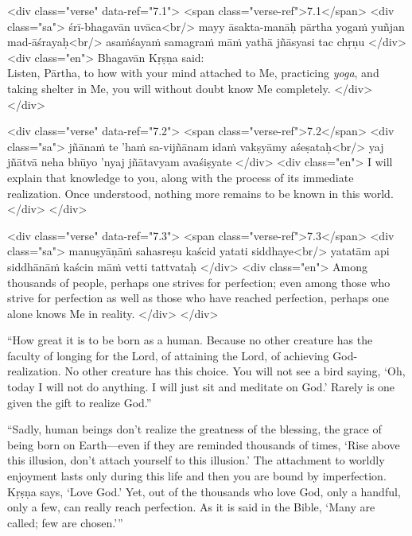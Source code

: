 \begin{html}
<div class="verse" data-ref="7.1">
  <span class="verse-ref">7.1</span>
  <div class="sa">
    śrī-bhagavān uvāca<br/>
    mayy āsakta-manāḥ pārtha yogaṁ yuñjan mad-āśrayaḥ<br/>
    asaṁśayaṁ samagraṁ māṁ yathā jñāsyasi tac chṛṇu
  </div>
  <div class="en">
    \hspace*{1em}Bhagavān Kṛṣṇa said: \\ Listen, Pārtha, to how with your mind attached to Me, practicing \textit{yoga}, and taking shelter in Me, you will without doubt know Me completely.
  </div>
</div>
\end{html}



\begin{html}
<div class="verse" data-ref="7.2">
  <span class="verse-ref">7.2</span>
  <div class="sa">
    jñānaṁ te ’haṁ sa-vijñānam idaṁ vakṣyāmy aśeṣataḥ<br/>
    yaj jñātvā neha bhūyo ’nyaj jñātavyam avaśiṣyate
  </div>
  <div class="en">
    I will explain that knowledge to you, along with the process of its immediate realization. Once understood, nothing more remains to be known in this world.
  </div>
</div>
\end{html}



\begin{html}
<div class="verse" data-ref="7.3">
  <span class="verse-ref">7.3</span>
  <div class="sa">
    manuṣyāṇāṁ sahasreṣu kaścid yatati siddhaye<br/>
    yatatām api siddhānāṁ kaścin māṁ vetti tattvataḥ
  </div>
  <div class="en">
    Among thousands of people, perhaps one strives for perfection; even among those who strive for perfection as well as those who have reached perfection, perhaps one alone knows Me in reality.
  </div>
</div>
\end{html}


\enquote{How great it is to be born as a human. Because no other creature has the faculty of longing for the Lord, of attaining the Lord, of achieving God-realization. No other creature has this choice. You will not see a bird saying, \enquote{Oh, today I will not do anything. I will just sit and meditate on God.} Rarely is one given the gift to realize God.}

\enquote{Sadly, human beings don’t realize the greatness of the blessing, the grace of being born on Earth---even if they are reminded thousands of times, \enquote{Rise above this illusion, don’t attach yourself to this illusion.} The attachment to worldly enjoyment lasts only during this life and then you are bound by imperfection. Kṛṣṇa says, \enquote{Love God.} Yet, out of the thousands who love God, only a handful, only a few, can really reach perfection. As it is said in the Bible, \enquote{Many are called; few are chosen.}}

